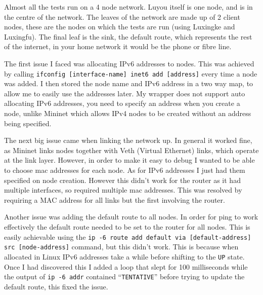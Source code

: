 \documentclass[12pt,a4paper,twoside,openright]{report}
\begin{document}
\bigskip

Almost all the tests run on a 4 node network.  Luyou itself is one node, and is in the centre of the network.  The leaves of the network are made up of 2 client nodes, these are the nodes on which the tests are run (using Luxingke and Luxingfu).  The final leaf is the sink, the default route, which represents the rest of the internet, in your home network it would be the phone or fibre line.

\bigskip

The first issue I faced was allocating IPv6 addresses to nodes. This was achieved by calling \verb!ifconfig [interface-name] inet6 add [address]! every time a node was added. I then stored the node name and IPv6 address in a two way map, to allow me to easily use the addresses later. My wrapper does not support auto allocating IPv6 addresses, you need to specify an address when you create a node, unlike Mininet which allows IPv4 nodes to be created without an address being specified.

\bigskip

The next big issue came when linking the network up. In general it worked fine, as Mininet links nodes together with Veth (Virtual Ethernet) links, which operate at the link layer.  However, in order to make it easy to debug I wanted to be able to choose mac addresses for each node. As for IPv6 addresses I just had them specified on node creation.  However this didn't work for the router as it had multiple interfaces, so required multiple mac addresses. This was resolved by requiring a MAC address for all links but the first involving the router.

\bigskip

Another issue was adding the default route to all nodes.  In order for ping to work effectively the default route needed to be set to the router for all nodes.  This is easily achievable using the \verb!ip -6 route add default via [default-address] src [node-address]! command, but this didn't work.  This is because when allocated in Linux IPv6 addresses take a while before shifting to the \verb!UP! state.  Once I had discovered this I added a loop that slept for 100 milliseconds while the output of \verb!ip -6 addr! contained ``\verb!TENTATIVE!'' before trying to update the default route, this fixed the issue.

\bigskip
\end{document}

